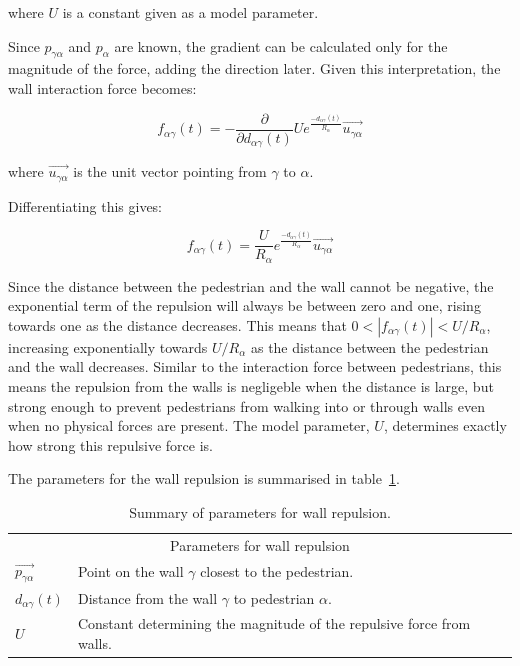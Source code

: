 where $U$ is a constant given as a model parameter.

Since $p_{\gamma \alpha}$ and $p_\alpha$ are known, the gradient can be 
calculated only for the magnitude of the force, adding the direction later. 
Given this interpretation, the wall interaction force becomes:


\begin{equation}
    f_{\alpha \gamma}(t) =
    -\frac{\partial}{\partial d_{\alpha \gamma}(t)}U e^{\frac{- d_{\alpha 
    \gamma}(t) }{ R_{\alpha} }} \overrightarrow{u_{\gamma \alpha}}
\end{equation}

where $\overrightarrow{u_{\gamma \alpha}}$ is the unit vector pointing from 
$\gamma$ to $\alpha$.

Differentiating this gives: 

\begin{equation}
    f_{\alpha \gamma}(t) =
    \frac{U}{R_\alpha} 
    e^{\frac{- d_{\alpha \gamma}(t) }{ R_{\alpha} }}
    \overrightarrow{u_{\gamma \alpha}}
    \label{eqn:wall-repulsion}
\end{equation}

Since the distance between the pedestrian and the wall cannot be negative, the 
exponential term of the repulsion will always be between zero and one, rising 
towards one as the distance decreases. This means that $0 < |f_{\alpha 
\gamma}(t)| < U/R_\alpha$, increasing exponentially towards $U/R_\alpha$ as 
the distance between the pedestrian and the wall decreases. Similar to the 
interaction force between pedestrians, this means the repulsion from the walls 
is negligeble when the distance is large, but strong enough to prevent 
pedestrians from walking into or through walls even when no physical forces 
are present. The model parameter, $U$, determines exactly how strong this 
repulsive force is.

The parameters for the wall repulsion is summarised in 
table~\ref{tbl:wall-repulsion}.

\begin{table}[h]
    \centering
    \begin{tabular}{l l}
        \toprule
        \multicolumn{2}{c}{\textsf{Parameters for wall repulsion}}\\
        $\overrightarrow{p_{\gamma \alpha}}$ & Point on the wall $\gamma$ closest to 
        the pedestrian.\\
        $d_{\alpha \gamma}(t)$ & Distance from the wall $\gamma$ to pedestrian 
        $\alpha$. \\
        $U$ & Constant determining the magnitude of the repulsive force from 
        walls. \\
        \bottomrule
    \end{tabular}
    \caption{Summary of parameters for wall repulsion.}
    \label{tbl:wall-repulsion}
\end{table}

